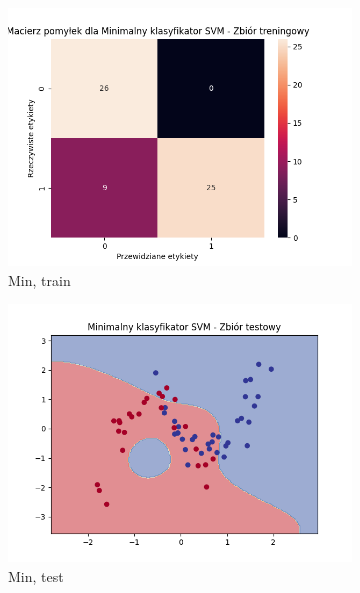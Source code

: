 \documentclass[12pt]{article}
\newcommand*{\subfigwidth}{0.24\textwidth}
\begin{document}
\begin{figure}[H]
\begin{subfigure}[t]{\subfigwidth}
        \includegraphics[width=\linewidth]{img/exp_3/svm/2_3/min/train_matrix.png}
        \caption{Min, train}
    \end{subfigure}
    \hfill
    \begin{subfigure}[t]{\subfigwidth}
        \includegraphics[width=\linewidth]{img/exp_3/svm/2_3/min/test_boundary.png}
        \caption{Min, test}
    \end{subfigure}
    \hfill
    \begin{subfigure}[t]{\subfigwidth}

\end{subfigure}
\end{figure}
\end{document}
